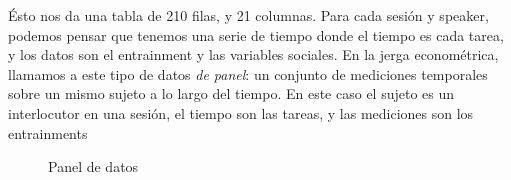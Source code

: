 Ésto nos da una tabla de 210 filas, y 21 columnas. Para cada sesión y speaker, podemos pensar que tenemos una serie de tiempo donde el tiempo es cada tarea, y los datos son el entrainment y las variables sociales. En la jerga econométrica, llamamos a este tipo de datos \emph{de panel}\cite{gujarati1999}: un conjunto de mediciones temporales sobre un mismo sujeto a lo largo del tiempo. En este caso el sujeto es un interlocutor en una sesión, el tiempo son las tareas, y las mediciones son los entrainments


\begin{figure}
\centering


\caption{Panel de datos}
\label{panel_data}
\end{figure}
